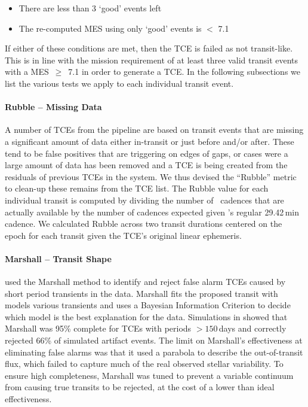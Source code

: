 \begin{itemize}
\item There are less than 3 `good' events left
\item The re-computed MES using only `good' events is $<$ 7.1
\end{itemize}

\noindent If either of these conditions are met, then the TCE is failed as not transit-like. This is in line with the \kepler{} mission requirement of at least three valid transit events with a MES~$\ge$~7.1 in order to generate a TCE. In the following subsections we list the various tests we apply to each individual transit event.


\paragraph{Rubble -- Missing Data}
\label{s:rubble}
A number of TCEs from the \kepler{} pipeline are based on transit events that are missing a significant amount of data either in-transit or just before and/or after. These tend to be false positives that are triggering on edges of gaps, or cases were a large amount of data has been removed and a TCE is being created from the residuals of previous TCEs in the system. We thus devised the ``Rubble'' metric to clean-up these remains from the TCE list. The Rubble value for each individual transit is computed by dividing the number of \Kepler\ cadences that are actually available by the number of cadences expected given \Kepler's regular 29.42\,min cadence.  We calculated Rubble across two transit durations centered on the epoch for each transit given the TCE's original linear ephemeris. 


\paragraph{Marshall -- Transit Shape}
\label{s:marshall}
\citet{Coughlin2016} used the Marshall method \citep{Mullally2016} to identify and reject false alarm TCEs caused by short period transients in the data. Marshall fits the proposed transit with models various transients and uses a Bayesian Information Criterion to decide which model is the best explanation for the data. Simulations in \citet{Mullally2016} showed that Marshall was 95\% complete for TCEs with periods $>150$\,days and correctly rejected 66\% of simulated artifact events. The limit on Marshall's effectiveness at eliminating false alarms was that it used a parabola to describe the out-of-transit flux, which failed to capture much of the real observed stellar variability. To ensure high completeness, Marshall was tuned to prevent a variable continuum from causing true transits to be rejected, at the cost of a lower than ideal effectiveness.

